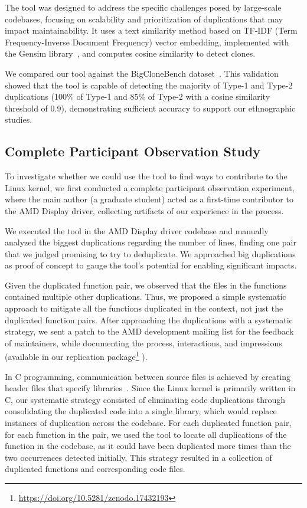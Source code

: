 \documentclass[10pt,conference]{IEEEtran}
\begin{document}
The tool was designed to address the specific challenges posed by large-scale codebases, focusing on scalability and prioritization of duplications that may impact maintainability. It uses a text similarity method based on TF-IDF (Term Frequency-Inverse Document Frequency) vector embedding, implemented with the Gensim library~\cite{gensim}, and computes cosine similarity to detect clones.

We compared our tool against the BigCloneBench dataset~\cite{bigclonebench}. This validation showed that the tool is capable of detecting the majority of Type-1 and Type-2 duplications (100\% of Type-1 and 85\% of Type-2 with a cosine similarity threshold of 0.9), demonstrating sufficient accuracy to support our ethnographic studies.

\subsection{Complete Participant Observation Study}
\label{sec:participant}

To investigate whether we could use the tool to find ways to contribute to the Linux kernel, we first conducted a complete participant observation experiment, where the main author (a graduate student) acted as a first-time contributor to the AMD Display driver, collecting artifacts of our experience in the process.

We executed the tool in the AMD Display driver codebase and manually analyzed the biggest duplications regarding the number of lines, finding one pair that we judged promising to try to deduplicate. We approached big duplications as proof of concept to gauge the tool's potential for enabling significant impacts.

Given the duplicated function pair, we observed that the files in the functions contained multiple other duplications. Thus, we proposed a simple systematic approach to mitigate all the functions duplicated in the context, not just the duplicated function pairs. After approaching the duplications with a systematic strategy, we sent a patch to the AMD development mailing list for the feedback of maintainers, while documenting the process, interactions, and impressions (available in our replication package\footnote{\url{https://doi.org/10.5281/zenodo.17432193}}	).

In C programming, communication between source files is achieved by creating header files that specify libraries~\cite{Cbook}. Since the Linux kernel is primarily written in C, our systematic strategy consisted of eliminating code duplications through consolidating the duplicated code into a single library, which would replace instances of duplication across the codebase. For each duplicated function pair, for each function in the pair, we used the tool to locate all duplications of the function in the codebase, as it could have been duplicated more times than the two occurrences detected initially. This strategy resulted in a collection of duplicated functions and corresponding code files.
\end{document}
